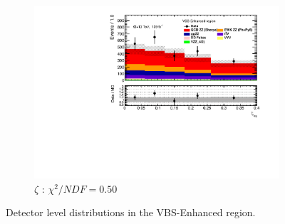 \begin{figure}[!htbp]
\begin{subfigure}{.49\textwidth}
        \includegraphics[width=.98\linewidth]{figures/Results/RecoDist_VBSEnhanced/reco_centrality_SR.pdf}
        \caption{ \footnotesize{$\zeta$ }: $\chi^2/NDF = 0.50$ }
    \end{subfigure}
    \caption{Detector level distributions in the VBS-Enhanced region.}  \label{fig:reco_VBS_Enhanced_b}
\end{figure}